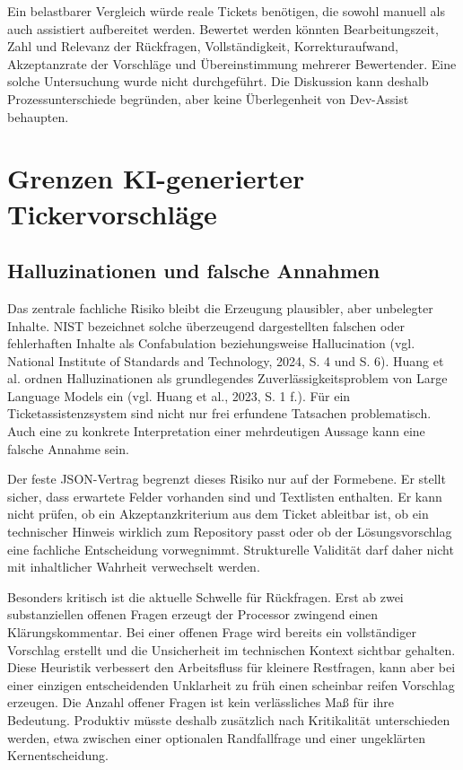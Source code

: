 Ein belastbarer Vergleich würde reale Tickets benötigen, die sowohl manuell als auch assistiert aufbereitet werden. Bewertet werden könnten Bearbeitungszeit, Zahl und Relevanz der Rückfragen, Vollständigkeit, Korrekturaufwand, Akzeptanzrate der Vorschläge und Übereinstimmung mehrerer Bewertender. Eine solche Untersuchung wurde nicht durchgeführt. Die Diskussion kann deshalb Prozessunterschiede begründen, aber keine Überlegenheit von Dev-Assist behaupten.

\section{Grenzen KI-generierter Tickervorschläge}

\subsection{Halluzinationen und falsche Annahmen}

Das zentrale fachliche Risiko bleibt die Erzeugung plausibler, aber unbelegter Inhalte. NIST bezeichnet solche überzeugend dargestellten falschen oder fehlerhaften Inhalte als Confabulation beziehungsweise Hallucination (vgl. National Institute of Standards and Technology, 2024, S. 4 und S. 6). Huang et al. ordnen Halluzinationen als grundlegendes Zuverlässigkeitsproblem von Large Language Models ein (vgl. Huang et al., 2023, S. 1 f.). Für ein Ticketassistenzsystem sind nicht nur frei erfundene Tatsachen problematisch. Auch eine zu konkrete Interpretation einer mehrdeutigen Aussage kann eine falsche Annahme sein.

Der feste JSON-Vertrag begrenzt dieses Risiko nur auf der Formebene. Er stellt sicher, dass erwartete Felder vorhanden sind und Textlisten enthalten. Er kann nicht prüfen, ob ein Akzeptanzkriterium aus dem Ticket ableitbar ist, ob ein technischer Hinweis wirklich zum Repository passt oder ob der Lösungsvorschlag eine fachliche Entscheidung vorwegnimmt. Strukturelle Validität darf daher nicht mit inhaltlicher Wahrheit verwechselt werden.

Besonders kritisch ist die aktuelle Schwelle für Rückfragen. Erst ab zwei substanziellen offenen Fragen erzeugt der Processor zwingend einen Klärungskommentar. Bei einer offenen Frage wird bereits ein vollständiger Vorschlag erstellt und die Unsicherheit im technischen Kontext sichtbar gehalten. Diese Heuristik verbessert den Arbeitsfluss für kleinere Restfragen, kann aber bei einer einzigen entscheidenden Unklarheit zu früh einen scheinbar reifen Vorschlag erzeugen. Die Anzahl offener Fragen ist kein verlässliches Maß für ihre Bedeutung. Produktiv müsste deshalb zusätzlich nach Kritikalität unterschieden werden, etwa zwischen einer optionalen Randfallfrage und einer ungeklärten Kernentscheidung.


